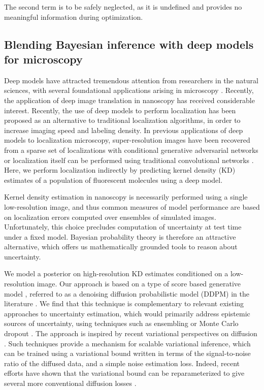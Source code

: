 The second term is to be safely neglected, as it is undefined and provides no meaningful information during optimization. 

\subsection{Blending Bayesian inference with deep models for microscopy}

Deep models have attracted tremendous attention from researchers in the natural sciences, with several foundational applications arising in microscopy \parencite{Weigert2018,Falk2019}. Recently, the application of deep image translation in nanoscopy has received considerable interest. Recently, the use of deep models to perform localization has been proposed as an alternative to traditional localization algorithms, in order to increase imaging speed and labeling density. In previous applications of deep models to localization microscopy, super-resolution images have been recovered from a sparse set of localizations with conditional generative adversarial networks \parencite{Ouyang2018} or localization itself can be performed using traditional convolutional networks \parencite{Nehme2020,Speiser2021}. Here, we perform localization indirectly by predicting kernel density (KD) estimates of a population of fluorescent molecules using a deep model. 

Kernel density estimation in nanoscopy is necessarily performed using a single low-resolution image, and thus common measures of model performance are based on localization errors computed over ensembles of simulated images. Unfortunately, this choice precludes computation of uncertainty at test time under a fixed model. Bayesian probability theory is therefore an attractive alternative, which offers us mathematically grounded tools to reason about uncertainty. 

We model a posterior on high-resolution KD estimates conditioned on a low-resolution image. Our approach is based on a type of score based generative model \parencite{Song2021}, referred to as a denoising diffusion probabilistic model (DDPM) in the literature \parencite{Ho2020,Song2021}. We find that this technique is complementary to relevant existing approaches to uncertainty estimation, which would primarily address epistemic sources of uncertainty, using techniques such as ensembling \parencite{Lakshminarayanan2017} or Monte Carlo dropout \parencite{Gal2022}. The approach is inspired by recent variational perspectives on diffusion \parencite{Dirmeier2023,Ribeiro2024,Kingma2021,Kingma2023}.  Such techniques provide a mechanism for scalable variational inference, which can be trained using a variational bound written in terms of the signal-to-noise ratio of the diffused data, and a simple noise estimation loss. Indeed, recent efforts have shown that the variational bound can be reparameterized to give several more conventional diffusion losses \parencite{Kingma2021,Kingma2023,Ribeiro2024}. 

